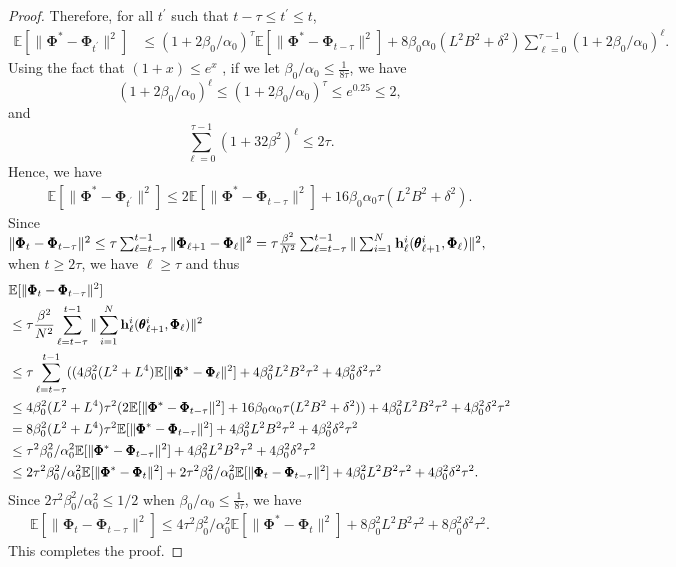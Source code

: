 \documentclass{article} %
\theoremstyle{plain}
\theoremstyle{definition}
\theoremstyle{remark}
\begin{document}
{\begin{proof}
Therefore, for all $t^\prime$ such that $t-\tau\leq t^\prime\leq t$,
\begin{align}
    \mathbb{E}[\|\pmb{\Phi}^*-\pmb{\Phi}_{t^\prime}\|^2]&\leq (1+2\beta_0/\alpha_0)^\tau\mathbb{E}[\|\pmb{\Phi}^*-\pmb{\Phi}_{t-\tau}\|^2]+8\beta_0\alpha_0(L^2B^2+\delta^2)\sum_{\ell=0}^{\tau-1}(1+2\beta_0/\alpha_0)^\ell. 
\end{align}
Using the fact that $(1+x)\leq e^x$ \citep{dal2023federated}, if we let $\beta_0/\alpha_0\leq \frac{1}{8\tau}$, we have $$(1+2\beta_0/\alpha_0)^\ell\leq (1+2\beta_0/\alpha_0)^\tau\leq e^{0.25}\leq 2,$$
and
 $$\sum_{\ell=0}^{\tau-1}(1+32\beta^2)^\ell\leq 2\tau.$$ 
 Hence, we have
\begin{align*}
    \mathbb{E}[\|\pmb{\Phi}^*-\pmb{\Phi}_{t^\prime}\|^2]\leq 2\mathbb{E}[\|\pmb{\Phi}^*-\pmb{\Phi}_{t-\tau}\|^2]+16\beta_0\alpha_0\tau (L^2B^2+\delta^2).
\end{align*}
Since $\|\pmb{\Phi}_t-\pmb{\Phi}_{t-\tau}\|^2\leq \tau\sum_{\ell=t-\tau}^{t-1}\|\pmb{\Phi}_{\ell+1}-\pmb{\Phi}_\ell\|^2=\tau\frac{\beta^2}{N^2}\sum_{\ell=t-\tau}^{t-1}\|\sum_{i=1}^N \mathbf{h}_\ell^i(\pmb{\theta}_{\ell+1}^i,\pmb{\Phi}_\ell)\|^2,$
when $t\geq 2\tau$, we have $\ell\geq \tau $ and thus
\begin{align*}
    &\mathbb{E}[\|\pmb{\Phi}_t-\pmb{\Phi}_{t-\tau}\|^2]\allowdisplaybreaks\\
    &\leq \tau\frac{\beta^2}{N^2}\sum_{\ell=t-\tau}^{t-1}\|\sum_{i=1}^N \bh_\ell^i(\pmb{\theta}_{\ell+1}^i,\pmb{\Phi}_\ell)\|^2\allowdisplaybreaks\\
    &\leq \tau \sum_{\ell=t-\tau}^{t-1}((4\beta_0^2(L^2+L^4)\mathbb{E}[\|\pmb{\Phi}^*-\pmb{\Phi}_\ell\|^2]+4\beta_0^2L^2B^2\tau^2 +4\beta_0^2\delta^2\tau^2\allowdisplaybreaks\\
    &\leq 4\beta_0^2(L^2+L^4)\tau^2(2\mathbb{E}[\|\pmb{\Phi}^*-\pmb{\Phi}_{t-\tau}\|^2]+16\beta_0\alpha_0\tau(L^2B^2+\delta^2))+4\beta_0^2L^2B^2\tau^2 +4\beta_0^2\delta^2\tau^2\allowdisplaybreaks\\
    &= 8\beta_0^2(L^2+L^4)\tau^2\mathbb{E}[\|\pmb{\Phi}^*-\pmb{\Phi}_{t-\tau}\|^2]+4\beta_0^2L^2B^2\tau^2 +4\beta_0^2\delta^2\tau^2\allowdisplaybreaks\\
    &\leq  \tau^2\beta_0^2/\alpha_0^2\mathbb{E}[\|\pmb{\Phi}^*-\pmb{\Phi}_{t-\tau}\|^2]+4\beta_0^2L^2B^2\tau^2 +4\beta_0^2\delta^2\tau^2\allowdisplaybreaks\\
    &\leq 2\tau^2\beta_0^2/\alpha_0^2\mathbb{E}[\|\pmb{\Phi}^*-\pmb{\Phi}_{t}\|^2]+2\tau^2\beta_0^2/\alpha_0^2\mathbb{E}[\|\pmb{\Phi}_t-\pmb{\Phi}_{t-\tau}\|^2]+4\beta_0^2L^2B^2\tau^2 +4\beta_0^2\delta^2\tau^2.
\end{align*}
Since $2\tau^2\beta_0^2/\alpha_0^2\leq 1/2$ when $\beta_0/\alpha_0\leq \frac{1}{8\tau}$, we have
\begin{align*}
   \mathbb{E}[\|\pmb{\Phi}_t-\pmb{\Phi}_{t-\tau}\|^2]\leq  4\tau^2\beta_0^2/\alpha_0^2\mathbb{E}[\|\pmb{\Phi}^*-\pmb{\Phi}_{t}\|^2]+8\beta_0^2L^2B^2\tau^2 +8\beta_0^2\delta^2\tau^2.
\end{align*}
This completes the proof.
\end{proof}

}
\end{document}
